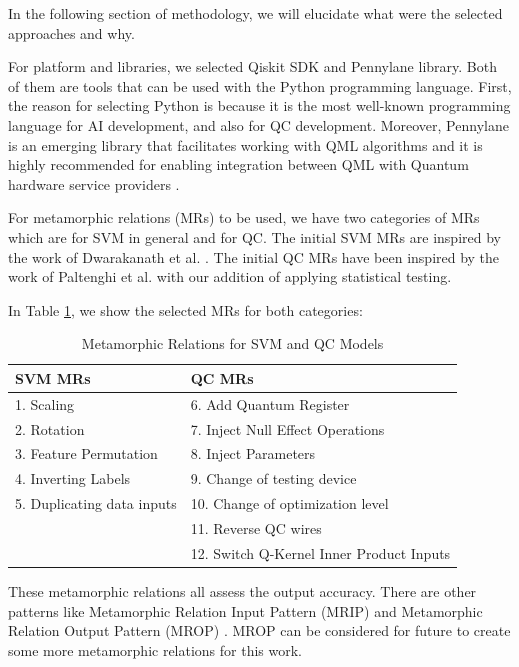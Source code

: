 \documentclass[12pt,a4paper]{article}
\begin{document}
	In the following section of methodology, we will elucidate what were the selected approaches and why.
	
	For platform and libraries, we selected Qiskit SDK and Pennylane library. Both of them are tools that can be used with the Python programming language. First, the reason for selecting Python is because it is the most well-known programming language for AI development, and also for QC development. Moreover, Pennylane is an emerging library that facilitates working with QML algorithms and it is highly recommended for enabling integration between QML with Quantum hardware service providers \cite{bergholm2022pennylaneautomaticdifferentiationhybrid}.
	
	For metamorphic relations (MRs) to be used, we have two categories of MRs which are for SVM in general and for QC. The initial SVM MRs are inspired by the work of Dwarakanath et al. \cite{Dwarakanath2018}. The initial QC MRs have been inspired by the work of Paltenghi et al. \cite{Paltenghi2023} with our addition of applying statistical testing.
	
	In Table \ref{tab:All_MRs}, we show the selected MRs for both categories:
	
	\begin{table}[h!]
		\centering
		\caption{Metamorphic Relations for SVM and QC Models}
		\label{tab:All_MRs}
		\begin{tabular}{|l|l|}
			\hline
			\textbf{SVM MRs} & \textbf{QC MRs} \\
			\hline
			1. Scaling & 6. Add Quantum Register \\
			2. Rotation & 7. Inject Null Effect Operations \\
			3. Feature Permutation & 8. Inject Parameters \\
			4. Inverting Labels & 9. Change of testing device \\
			5. Duplicating data inputs & 10. Change of optimization level \\
			& 11. Reverse QC wires \\
			& 12. Switch Q-Kernel Inner Product Inputs \\
			\hline
		\end{tabular}
	\end{table}
	
	These metamorphic relations all assess the output accuracy. There are other patterns like Metamorphic Relation Input Pattern (MRIP) and Metamorphic Relation Output Pattern (MROP) \cite{8785455}. MROP can be considered for future to create some more metamorphic relations for this work. 
	
\end{document}
